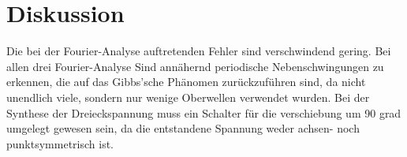 \section{Diskussion}
\label{sec:Diskussion}
Die bei der Fourier-Analyse auftretenden Fehler sind verschwindend gering.
Bei allen drei Fourier-Analyse Sind annähernd periodische Nebenschwingungen zu erkennen, die auf das Gibbs'sche Phänomen zurückzuführen sind, da nicht unendlich viele, sondern nur wenige Oberwellen verwendet wurden. 
Bei der Synthese der Dreieckspannung muss ein Schalter für die verschiebung um 90 grad umgelegt gewesen sein, da die entstandene Spannung weder achsen- noch punktsymmetrisch ist.